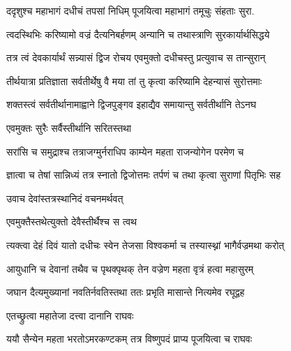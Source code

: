 \twolineshloka
{ददृशुश्च महाभागं दधीचं तपसां निधिम्}
{पूजयित्वा महाभागं तमूचुः संहताः सुरा.}%

\twolineshloka
{त्वदस्थिभिः करिष्यामो वज्रं दैत्यनिबर्हणम्}
{अन्यानि च तथास्त्राणि सुरकार्यार्थसिद्धये}%

\twolineshloka
{तत्र त्वं देवकार्यार्थं सन्न्यासं द्विज रोचय}
{एवमुक्तो दधीचस्तु प्रत्युवाच स तान्सुरान्}%

\twolineshloka
{तीर्थयात्रा प्रतिज्ञाता सर्वतीर्थेषु वै मया}
{तां तु कृत्वा करिष्यामि देहन्यासं सुरोत्तमाः}%


\twolineshloka
{शक्तस्त्वं सर्वतीर्थानामाह्वाने द्विजपुङ्गव}
{इहाद्यैव समायान्तु सर्वतीर्थानि तेऽनघ}%


\onelineshloka
{एवमुक्तः सुरैः सर्वैस्तीर्थानि सरितस्तथा}%

\twolineshloka
{सरांसि च समुद्राश्च तत्राजग्मुर्नराधिप}
{काम्येन महता राजन्योगेन परमेण च}%

\twolineshloka
{ज्ञात्वा च तेषां सान्निध्यं तत्र स्नातो द्विजोत्तमः}
{तर्पणं च तथा कृत्वा सुराणां पितृभिः सह}%

\onelineshloka
{उवाच देवांस्तत्रस्थानिदं वचनमर्थवत्}



\onelineshloka
{एवमुक्तैस्तथेत्युक्तो देवैस्तीर्थैश्च स त्वथ}%

\twolineshloka
{त्यक्त्वा देहं दिवं यातो दधीचः स्वेन तेजसा}
{विश्वकर्मा च तस्यास्थ्नां भागैर्वज्रमथा करोत्}%

\twolineshloka
{आयुधानि च देवानां तथैव च पृथक्पृथक्}
{तेन वज्रेण महता वृत्रं हत्वा महासुरम्}%

\twolineshloka
{जघान दैत्यमुख्यानां नवतिर्नवतिस्तथा}
{ततः प्रभृति मासान्ते नित्यमेव रघूद्वह}%


\onelineshloka
{एतच्छ्रुत्वा महातेजा दत्त्वा दानानि राघवः}%

\twolineshloka
{ययौ सैन्येन महता भरतोऽमरकण्टकम्}
{तत्र विष्णुपदं प्राप्य पूजयित्वा च राघवः}%

